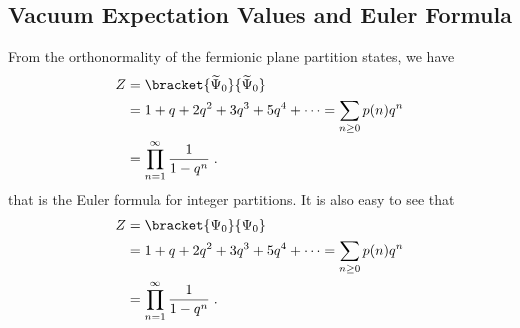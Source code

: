 \subsection{Vacuum Expectation Values and Euler Formula}

From the orthonormality of the fermionic plane partition states, we have
\begin{equation}
\begin{split}
  Z & = \bracket{\widetilde{\Psi}_0}{\widetilde{\Psi}_0}\\
  & = 1 + q + 2 q^2 + 3 q^3 + 5 q^4 + \dots = \sum_{n\geq 0} p(n) q^n \\
  & = \prod_{n=1}^\infty \frac{1}{1-q^n}\; .
\end{split}
\end{equation}
that is the Euler formula for integer partitions. It is also easy to see that 
\begin{equation}
\begin{split}
  Z & = \bracket{\Psi_0}{\Psi_0}\\
  & = 1 + q + 2 q^2 + 3 q^3 + 5 q^4 + \dots = \sum_{n\geq 0} p(n) q^n \\
  & = \prod_{n=1}^\infty \frac{1}{1-q^n}\; .
\end{split}
\end{equation}


